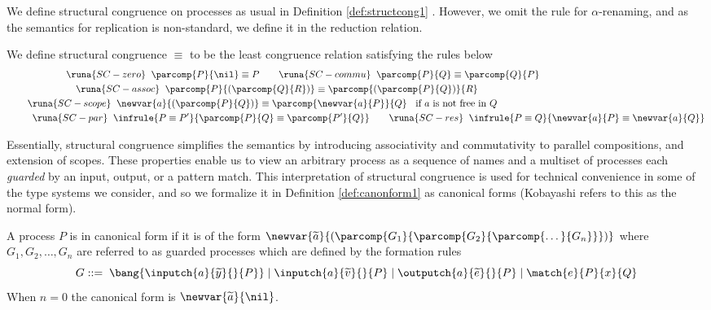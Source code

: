 
We define structural congruence on processes as usual in Definition \ref{def:structcong1} \cite{Milner1993}. However, we omit the rule for $\alpha$-renaming, and as the semantics for replication is non-standard, we define it in the reduction relation. %
%
\begin{defi}
We define structural congruence $\equiv$ to be the least congruence relation satisfying the rules below
%
\begin{align*}
    &\kern6em\runa{SC-zero}\;\;\parcomp{P}{\nil} \equiv P\kern2em \runa{SC-commu}\;\; \parcomp{P}{Q} \equiv \parcomp{Q}{P}\\ &\kern7em\runa{SC-assoc}\;\; \parcomp{P}{\left(\parcomp{Q}{R}\right)} \equiv \parcomp{\left(\parcomp{P}{Q}\right)}{R}\\
    &\kern2em\runa{SC-scope}\;\;\newvar{a}{\left(\parcomp{P}{Q}\right)} \equiv \parcomp{\newvar{a}{P}}{Q}\;\; \text{ if } a \text{ is not free in } Q\\
    &\kern2.5em\runa{SC-par}\;\;\infrule{P \equiv P'}{\parcomp{P}{Q} \equiv \parcomp{P'}{Q}} \kern2em
    \runa{SC-res}\;\;\infrule{P \equiv Q}{\newvar{a}{P} \equiv \newvar{a}{Q}}\\
\end{align*}
\label{def:structcong1}
\end{defi}
%
Essentially, structural congruence simplifies the semantics by introducing associativity and commutativity to parallel compositions, and extension of scopes. These properties enable us to view an arbitrary process as a sequence of names and a multiset of processes each \textit{guarded} by an input, output, or a pattern match. This interpretation of structural congruence is used for technical convenience in some of the type systems we consider, and so we formalize it in Definition \ref{def:canonform1} as canonical forms (Kobayashi \cite{Kobayashi2000} refers to this as the normal form).
%
\begin{defi}
A process $P$ is in canonical form if it is of the form $\newvar{\widetilde{a}}{\left(\parcomp{G_1}{\parcomp{G_2}{\parcomp{\dots}{G_n}}}\right)}$
 where $G_1,G_2,\dots,G_n$ are referred to as guarded processes which are defined by the formation rules
\begin{equation*}
    G ::=\; \bang{\inputch{a}{\widetilde{y}}{}{P}} \mid \inputch{a}{\widetilde{v}}{}{P} \mid \outputch{a}{\widetilde{e}}{}{P} \mid \match{e}{P}{x}{Q}
\end{equation*}
When $n = 0$ the canonical form is $\newvar{\widetilde{a}}{\nil}$.
\label{def:canonform1}
\end{defi}
